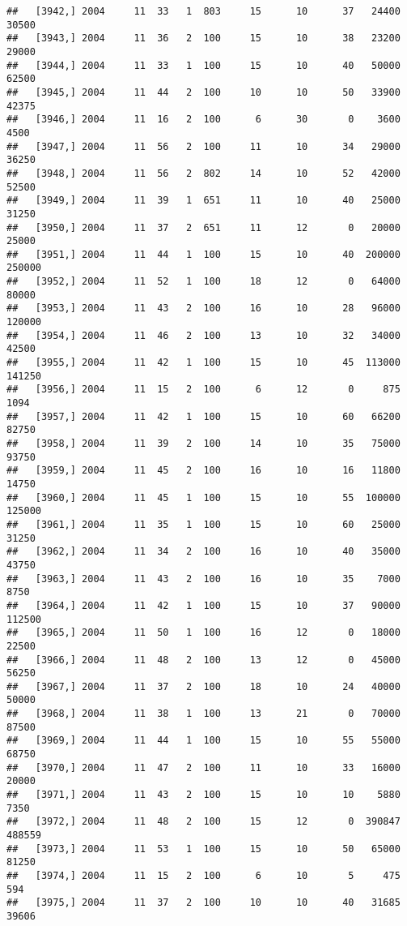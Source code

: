 \documentclass{article}\usepackage[]{graphicx}\usepackage[]{color}
\makeatletter
\newenvironment{kframe}{%
 \def\at@end@of@kframe{}%
 \ifinner\ifhmode%
  \def\at@end@of@kframe{\end{minipage}}%
  \begin{minipage}{\columnwidth}%
 \fi\fi%
 \def\FrameCommand##1{\hskip\@totalleftmargin \hskip-\fboxsep
 \colorbox{shadecolor}{##1}\hskip-\fboxsep
     \hskip-\linewidth \hskip-\@totalleftmargin \hskip\columnwidth}%
 \MakeFramed {\advance\hsize-\width
   \@totalleftmargin\z@ \linewidth\hsize
   \@setminipage}}%
 {\par\unskip\endMakeFramed%
 \at@end@of@kframe}
\newenvironment{knitrout}{}{} %
\makeatother
\begin{document}
\begin{knitrout}
\begin{kframe}
\begin{verbatim}
##   [3942,] 2004     11  33   1  803     15      10      37   24400   30500
##   [3943,] 2004     11  36   2  100     15      10      38   23200   29000
##   [3944,] 2004     11  33   1  100     15      10      40   50000   62500
##   [3945,] 2004     11  44   2  100     10      10      50   33900   42375
##   [3946,] 2004     11  16   2  100      6      30       0    3600    4500
##   [3947,] 2004     11  56   2  100     11      10      34   29000   36250
##   [3948,] 2004     11  56   2  802     14      10      52   42000   52500
##   [3949,] 2004     11  39   1  651     11      10      40   25000   31250
##   [3950,] 2004     11  37   2  651     11      12       0   20000   25000
##   [3951,] 2004     11  44   1  100     15      10      40  200000  250000
##   [3952,] 2004     11  52   1  100     18      12       0   64000   80000
##   [3953,] 2004     11  43   2  100     16      10      28   96000  120000
##   [3954,] 2004     11  46   2  100     13      10      32   34000   42500
##   [3955,] 2004     11  42   1  100     15      10      45  113000  141250
##   [3956,] 2004     11  15   2  100      6      12       0     875    1094
##   [3957,] 2004     11  42   1  100     15      10      60   66200   82750
##   [3958,] 2004     11  39   2  100     14      10      35   75000   93750
##   [3959,] 2004     11  45   2  100     16      10      16   11800   14750
##   [3960,] 2004     11  45   1  100     15      10      55  100000  125000
##   [3961,] 2004     11  35   1  100     15      10      60   25000   31250
##   [3962,] 2004     11  34   2  100     16      10      40   35000   43750
##   [3963,] 2004     11  43   2  100     16      10      35    7000    8750
##   [3964,] 2004     11  42   1  100     15      10      37   90000  112500
##   [3965,] 2004     11  50   1  100     16      12       0   18000   22500
##   [3966,] 2004     11  48   2  100     13      12       0   45000   56250
##   [3967,] 2004     11  37   2  100     18      10      24   40000   50000
##   [3968,] 2004     11  38   1  100     13      21       0   70000   87500
##   [3969,] 2004     11  44   1  100     15      10      55   55000   68750
##   [3970,] 2004     11  47   2  100     11      10      33   16000   20000
##   [3971,] 2004     11  43   2  100     15      10      10    5880    7350
##   [3972,] 2004     11  48   2  100     15      12       0  390847  488559
##   [3973,] 2004     11  53   1  100     15      10      50   65000   81250
##   [3974,] 2004     11  15   2  100      6      10       5     475     594
##   [3975,] 2004     11  37   2  100     10      10      40   31685   39606

\end{verbatim}
\end{kframe}
\end{knitrout}
\end{document}
